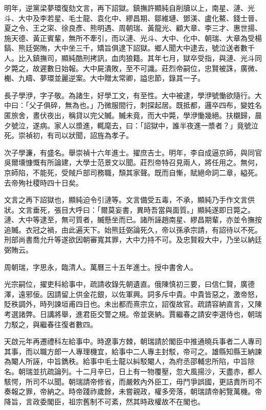 \begin{pinyinscope}
明年，逆黨梁夢環復劾文言，再下詔獄。鎮撫許顯純自削牘以上，南星、漣、光斗、大中及李若星、毛士龍、袁化中、繆昌期、鄒維璉、鄧渼、盧化鰲、錢士晉、夏之令、王之寀、徐良彥、熊明遇、周朝瑞、黃龍光、顧大章、李三才、惠世揚、施天德、黃正賓輩，無所不牽引，而以漣、光斗、大中、化中、朝瑞、大章為受楊鎬、熊廷弼賄，大中坐三千，矯旨俱逮下詔獄。鄉人聞大中逮去，號泣送者數千人。比入鎮撫司，顯純酷刑拷訊，血肉狼籍。其年七月，獄卒受指，與漣、光斗同夕斃之，故遲數日始報。大中屍潰敗，至不可識。莊烈帝嗣位，忠賢被誅，廣微、櫆、九疇、夢環並麗逆案。大中贈太常卿，謚忠節，錄其一子。

長子學洢，字子敬。為諸生，好學工文，有至性。大中被逮，學洢號慟欲隨行。大中曰：「父子俱碎，無為也。」乃微服間行，刺探起居。既抵都，邏卒四布，變姓名匿旅舍，晝伏夜出，稱貸以完父贓。贓未竟，而大中斃，學洢慟幾絕。扶櫬歸，晨夕號泣，遂病。家人以漿進，輒麾去，曰：「詔獄中，誰半夜進一漿者？」竟號泣死。崇禎初，有司以狀聞，詔旌為孝子。

次子學濂，有盛名。舉崇禎十六年進士。擢庶吉士。明年，李自成逼京師，與同官吳爾壎慷慨有所論建，大學士范景文以聞。莊烈帝特召見兩人，將任用之。無何，京師陷，不能死，受賊戶部司務職，頹其家聲。既而自慚，賦絕命詞二章，縊死。去帝殉社稷時四十日矣。

文言之再下詔獄也，顯純迫令引漣等。文言備受五毒，不承，顯純乃手作文言供狀。文言垂死，張目大呼曰：「爾莫妄書，異時吾當與面質。」顯純遂即日斃之。漣、大中等逮至，無可質者，贓懸坐而已。諸所誣趙南星、繆昌期輩，亦並令撫按追贓。衣冠之禍，由此遍天下。始熊廷弼論死久，帝以孫承宗請，有詔待以不死。刑部尚書喬允升等遂欲因朝審寬其罪，大中力持不可。及忠賢殺大中，乃坐以納廷弼賄云。

周朝瑞，字思永，臨清人。萬曆三十五年進士。授中書舍人。

光宗嗣位，擢吏科給事中，疏請收錄先朝遺直。俄陳慎初三要，曰信仁賢，廣德澤，遠邪佞。因請留上供金花銀，以佐軍興。詞多斥中貴。中貴皆惡之，激帝怒，貶秩調外，時列諫垣甫四日也。未出都而熹宗立，詔復故官。疏請容納直言，又陳考選諸弊。日講將舉，進君臣交警之規。帝並褒納。賈繼春之請安李選侍也，朝瑞力駁之，與繼春往復者數四。

天啟元年再遷禮科左給事中。時遼事方棘，朝瑞請於閣臣中推通曉兵事者二人專司其事，而以職方郎一人專理機宜，給事中二人專主封駁，帝可之。雄縣知縣王納諫為閹人所誣，中旨鐫秩。給事中毛士龍以糾駁閹人，為府丞邵輔忠所陷，中旨除名。朝瑞並抗疏論列。十二月辛巳，日上有一物覆壓，忽大風揚沙，天盡赤，都人駭愕，所司不以聞。朝瑞請帝修省，而嚴敕內外臣工，毋鬥爭誤國，更詰責所司不奏報之罪，帝納之。時帝踐祚歲餘，未嘗親政，權多旁落，朝瑞請帝躬覽萬機。帝降旨，言政委閣臣，祖宗舊制不可紊，然其時政權故不在閣也。


\end{pinyinscope}
